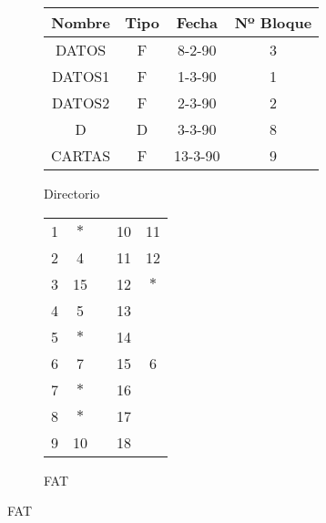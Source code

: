 \begin{ejercicio}
    \begin{figure}[H]
        \centering
        \begin{subfigure}[c]{0.5\textwidth}
            \centering
            \begin{tabular}{|c|c|c|c|}
                Nombre & Tipo & Fecha  & Nº Bloque \\ \hline \hline
                DATOS  & F    & 8-2-90 & 3         \\ \hline
                DATOS1 & F    & 1-3-90 & 1         \\ \hline
                DATOS2 & F    & 2-3-90 & 2         \\ \hline
                D      & D    & 3-3-90 & 8          \\ \hline
                CARTAS & F    & 13-3-90& 9         \\ \hline
            \end{tabular}
            \caption{Directorio}
        \end{subfigure}\hfill
        \begin{subfigure}[c]{0.5\textwidth}
            \centering
            \begin{tabular}{c|c|cc|c|}
                \cline{2-2} \cline{5-5}
                1 & $\ast$ &\hspace{1cm}& 10 & 11 \\ \cline{2-2} \cline{5-5} 
                2 & 4  && 11 & 12 \\ \cline{2-2} \cline{5-5} 
                3 & 15  && 12 & $\ast$ \\ \cline{2-2} \cline{5-5} 
                4 & 5 && 13 &  \\ \cline{2-2} \cline{5-5} 
                5 & $\ast$  && 14 &  \\ \cline{2-2} \cline{5-5} 
                6 & 7 && 15 & 6 \\ \cline{2-2} \cline{5-5} 
                7 & $\ast$ && 16 &  \\ \cline{2-2} \cline{5-5} 
                8 & $\ast$  && 17 &  \\ \cline{2-2} \cline{5-5} 
                9 & 10 && 18 &  \\ \cline{2-2} \cline{5-5} 
            \end{tabular}
            \caption{FAT}
        \end{subfigure}
        \label{fig:Rel4_Ej2}
    \end{figure}
\end{ejercicio}

